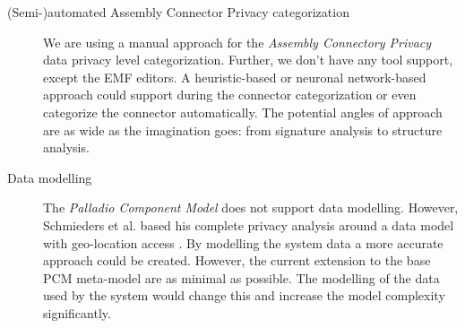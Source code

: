 \begin{description}
	\item[(Semi-)automated Assembly Connector Privacy categorization]
	We are using a manual approach for the \textit{Assembly Connectory Privacy} data privacy level categorization. Further, we don't have any tool support, except the EMF editors. A heuristic-based or neuronal network-based approach could support during the connector categorization or even categorize the connector automatically. The potential angles of approach are as wide as the imagination goes: from signature analysis to structure analysis.
\end{description}

\begin{description}
	\item[Data modelling]
	The \textit{Palladio Component Model} does not support data modelling. However, Schmieders et al. based his complete privacy analysis around a data model with geo-location access \cite{Schmieders.2015}\cite{Schmieders.}. By modelling the system data a more accurate approach could be created. However, the current extension to the base PCM meta-model are as minimal as possible. The modelling of the data used by the system would change this and increase the model complexity significantly.
\end{description}




